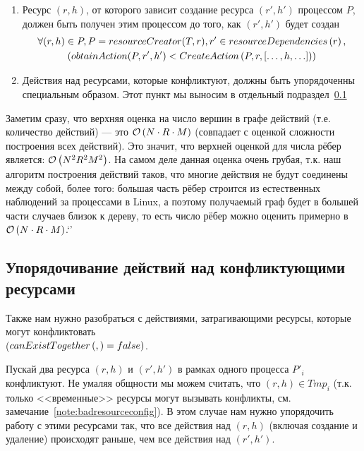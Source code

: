 \begin{enumerate}
	\item \label{chap2:preced:f} \label{chap2:preced:lastSimple} Ресурс $(r, h)$, от которого зависит создание ресурса $(r', h')$ процессом $P$, должен быть получен этим процессом до того, как $(r', h')$ будет создан
		\begin{gather*}
			\forall (r, h) \in P, P = resourceCreator(T, r), r' \in resourceDependencies\left( r \right), \\
			(obtainAction(P, r', h') < CreateAction\left( P, r, [\ldots, h, \ldots] \right))
		\end{gather*}

	\item \label{chap2:preced:g} Действия над ресурсами, которые конфликтуют, должны быть упорядоченны специальным образом. Этот пункт мы выносим в отдельный подраздел~\ref{chap2:subsec:conflictresolution}
\end{enumerate}

Заметим сразу, что верхняя оценка на число вершин в графе действий (т.е. количество действий) --- это $\mathcal{O}\left(N \cdot R \cdot M\right)$ (совпадает с оценкой сложности построения всех действий). Это значит, что верхней оценкой для числа рёбер является: $\mathcal{O}\left(N^2R^2M^2\right)$. На самом деле данная оценка очень грубая, т.к. наш алгоритм построения действий таков, что многие действия не будут соединены между собой, более того: большая часть рёбер строится из естественных наблюдений
за процессами в Linux, а поэтому получаемый граф будет в большей части случаев близок к дереву, то есть число рёбер можно оценить примерно в $\mathcal{O}\left(N\cdot R \cdot M\right)$.`'

\subsection{Упорядочивание действий над конфликтующими ресурсами}
\label{chap2:subsec:conflictresolution}

Также нам нужно разобраться с действиями, затрагивающими ресурсы, которые могут конфликтовать \\
($canExistTogether\left( ,  \right) = false)$. 

Пускай два ресурса $(r, h)$ и $(r', h')$ в рамках одного процесса $P'_i$ конфликтуют. 
Не умаляя общности мы можем считать, что $(r, h) \in Tmp_i$ 
(т.к. только <<временные>> ресурсы могут вызывать конфликты, см. замечание~\ref{note:badresourceconfig}). 
В этом случае нам нужно упорядочить работу с этими ресурсами так, что все действия над $(r, h)$ 
(включая создание и удаление) происходят раньше, чем все действия над $(r', h')$.

